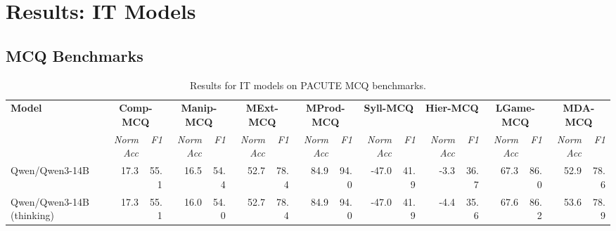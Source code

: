 \documentclass{article}
\begin{document}
\section*{Results: IT Models}

\subsection*{MCQ Benchmarks}

\begin{table}[htbp]
\centering
\caption{Results for IT models on PACUTE MCQ benchmarks.}
\label{tab:results-it:mcq}
\begin{threeparttable}
\begin{adjustbox}{max width=\textwidth}
\begin{tabular}{lrrrrrrrrrrrrrrrr}
\toprule
\textbf{Model} & \multicolumn{2}{c}{\textbf{Comp-MCQ}} & \multicolumn{2}{c}{\textbf{Manip-MCQ}} & \multicolumn{2}{c}{\textbf{MExt-MCQ}} & \multicolumn{2}{c}{\textbf{MProd-MCQ}} & \multicolumn{2}{c}{\textbf{Syll-MCQ}} & \multicolumn{2}{c}{\textbf{Hier-MCQ}} & \multicolumn{2}{c}{\textbf{LGame-MCQ}} & \multicolumn{2}{c}{\textbf{MDA-MCQ}} \\
\cmidrule(lr){2-3}\cmidrule(lr){4-5}\cmidrule(lr){6-7}\cmidrule(lr){8-9}\cmidrule(lr){10-11}\cmidrule(lr){12-13}\cmidrule(lr){14-15}\cmidrule(lr){16-17}
 & \textit{NormAcc} & \textit{F1} & \textit{NormAcc} & \textit{F1} & \textit{NormAcc} & \textit{F1} & \textit{NormAcc} & \textit{F1} & \textit{NormAcc} & \textit{F1} & \textit{NormAcc} & \textit{F1} & \textit{NormAcc} & \textit{F1} & \textit{NormAcc} & \textit{F1} \\
\midrule
Qwen/Qwen3-14B & \cellcolor[HTML]{F5F9FC}17.3 & \cellcolor[HTML]{ECF4F9}55.1 & \cellcolor[HTML]{F2F8FB}16.5 & \cellcolor[HTML]{E5F1F7}54.4 & \cellcolor[HTML]{D7EAF3}52.7 & \cellcolor[HTML]{CCE4EF}78.4 & \cellcolor[HTML]{9DCBE1}84.9 & \cellcolor[HTML]{9AC9E0}94.0 & \cellcolor[HTML]{FBDED2}-47.0 & \cellcolor[HTML]{FBE3D8}41.9 & \cellcolor[HTML]{FADDD0}-3.3 & \cellcolor[HTML]{FBDED2}36.7 & \cellcolor[HTML]{C5E0ED}67.3 & \cellcolor[HTML]{B6D8E8}86.0 & \cellcolor[HTML]{D1E6F1}52.9 & \cellcolor[HTML]{BEDCEB}78.6 \\
Qwen/Qwen3-14B (thinking) & \cellcolor[HTML]{F5F9FC}17.3 & \cellcolor[HTML]{ECF4F9}55.1 & \cellcolor[HTML]{F4F9FB}16.0 & \cellcolor[HTML]{E8F2F8}54.0 & \cellcolor[HTML]{D7EAF3}52.7 & \cellcolor[HTML]{CCE4EF}78.4 & \cellcolor[HTML]{9DCBE1}84.9 & \cellcolor[HTML]{9AC9E0}94.0 & \cellcolor[HTML]{FBDED2}-47.0 & \cellcolor[HTML]{FBE3D8}41.9 & \cellcolor[HTML]{F7C1A9}-4.4 & \cellcolor[HTML]{F7C2AA}35.6 & \cellcolor[HTML]{C5E0ED}67.6 & \cellcolor[HTML]{B5D7E8}86.2 & \cellcolor[HTML]{CFE5F0}53.6 & \cellcolor[HTML]{BCDBEB}78.9 \\

\end{tabular}
\end{adjustbox}
\end{threeparttable}
\end{table}
\end{document}
